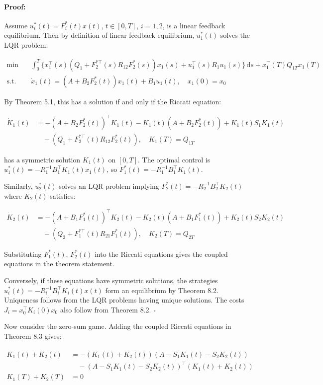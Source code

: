 \documentclass[3p]{elsarticle}
\newenvironment{proof}{\paragraph{Proof:}}{\hfill$\square$}
\begin{document}
\begin{proof}
Assume $u_i^*(t) = F_i^*(t) x(t)$, $t \in [0,T]$, $i=1,2$, is a linear feedback equilibrium. Then by definition of linear feedback equilibrium, $u_1^*(t)$ solves the LQR problem:

\begin{align*}
\text{min} \quad & \int_0^T \{ x_1^\top(s) (Q_1 + F_{2}^{*\top}(s)R_{12}F_2^*(s)) x_1(s) + u_1^\top(s) R_1 u_1(s) \}\,\mathrm{d}s + x_1^\top(T) Q_{1T} x_1(T) \\
\text{s.t.} \quad & \dot{x}_1(t) = (A + B_2 F_2^*(t)) x_1(t) + B_1 u_1(t), \quad x_1(0) = x_0
\end{align*}

By Theorem 5.1, this has a solution if and only if the Riccati equation:

\begin{align*}
\dot{K}_1(t) &= -(A+B_2F_2^*(t))^\top K_1(t) - K_1(t)(A+B_2F_2^*(t)) + K_1(t)S_1K_1(t) \\
&\quad - (Q_1 + F_{2}^{*\top}(t)R_{12}F_2^*(t)), \quad K_1(T) = Q_{1T}  
\end{align*}

has a symmetric solution $K_1(t)$ on $[0,T]$. The optimal control is $u_1^*(t) = -R_1^{-1}B_1^\top K_1(t) x_1(t)$, so $F_1^*(t) = -R_1^{-1}B_1^\top K_1(t)$.

Similarly, $u_2^*(t)$ solves an LQR problem implying $F_2^*(t) = -R_2^{-1}B_2^\top K_2(t)$ where $K_2(t)$ satisfies: 

\begin{align*}
\dot{K}_2(t) &= -(A+B_1F_1^*(t))^\top K_2(t) - K_2(t)(A+B_1F_1^*(t)) + K_2(t)S_2K_2(t) \\  
&\quad - (Q_2 + F_{1}^{*\top}(t)R_{21}F_1^*(t)), \quad K_2(T) = Q_{2T}
\end{align*}

Substituting $F_1^*(t)$, $F_2^*(t)$ into the Riccati equations gives the coupled equations in the theorem statement.

Conversely, if these equations have symmetric solutions, the strategies $u_i^*(t) = -R_i^{-1}B_i^\top K_i(t) x(t)$ form an equilibrium by Theorem 8.2. Uniqueness follows from the LQR problems having unique solutions. The costs $J_i = x_0^\top K_i(0) x_0$ also follow from Theorem 8.2.
\end{proof}

Now consider the zero-sum game. Adding the coupled Riccati equations in Theorem 8.3 gives:

\begin{align*}
\dot{K}_1(t) + \dot{K}_2(t) &= -(K_1(t) + K_2(t))(A - S_1K_1(t) - S_2K_2(t)) \\  
&\quad - (A - S_1K_1(t) - S_2K_2(t))^\top(K_1(t) + K_2(t)) \\
K_1(T) + K_2(T) &= 0
\end{align*}
\end{document}
